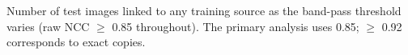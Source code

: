 Number of test images linked to any training source as the band-pass threshold varies (raw NCC $\ge$ 0.85 throughout). The primary analysis uses 0.85; $\ge$ 0.92 corresponds to exact copies.
